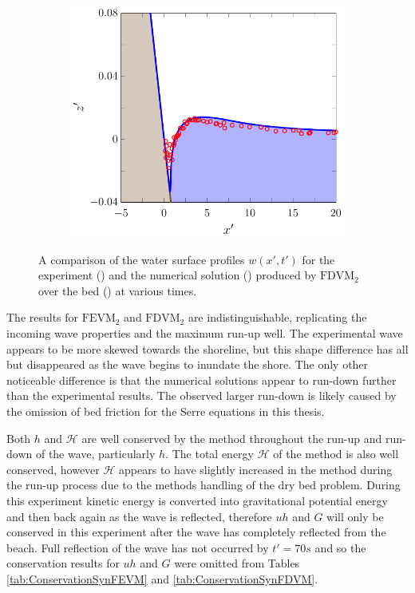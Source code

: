 \begin{figure}
\begin{subfigure}{0.5\textwidth}
		\vspace{0.5cm}
	\end{subfigure}
	\begin{subfigure}{0.5\textwidth}
		\includegraphics[width=\textwidth]{./chp6/figures/Experiment/Synolakis/H0p0185/FDVM/70s.pdf}
		\vspace{0.5cm}
	\end{subfigure}
	\caption{A comparison of the water surface profiles $w(x',t')$ for the experiment () and the numerical solution () produced by $\text{FDVM}_2$ over the bed () at various times.}
	\label{fig:SynolakisFDVMNoBreak}
\end{figure}

The results for $\text{FEVM}_2$ and $\text{FDVM}_2$ are indistinguishable, replicating the incoming wave properties and the maximum run-up well. The experimental wave appears to be more skewed towards the shoreline, but this shape difference has all but disappeared as the wave begins to inundate the shore. The only other noticeable difference is that the numerical solutions appear to run-down further than the experimental results. The observed larger run-down is likely caused by the omission of bed friction for the Serre equations in this thesis.

Both $h$ and $\mathcal{H}$ are well conserved by the method throughout the run-up and run-down of the wave, particularly $h$. The total energy $\mathcal{H}$ of the method is also well conserved, however $\mathcal{H}$ appears to have slightly increased in the method during the run-up process due to the methods handling of the dry bed problem. During this experiment kinetic energy is converted into gravitational potential energy and then back again as the wave is reflected, therefore $uh$ and $G$ will only be conserved in this experiment after the wave has completely reflected from the beach. Full reflection of the wave has not occurred by $t'=70s$ and so the conservation results for $uh$ and $G$ were omitted from Tables \ref{tab:ConservationSynFEVM} and \ref{tab:ConservationSynFDVM}.

